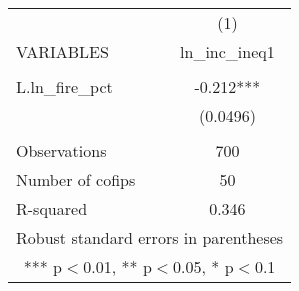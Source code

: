 \begin{tabular}{lc} \hline
 & (1) \\
VARIABLES & ln\_inc\_ineq1 \\ \hline
 &  \\
L.ln\_fire\_pct & -0.212*** \\
 & (0.0496) \\
 &  \\
Observations & 700 \\
Number of cofips & 50 \\
 R-squared & 0.346 \\ \hline
\multicolumn{2}{c}{ Robust standard errors in parentheses} \\
\multicolumn{2}{c}{ *** p$<$0.01, ** p$<$0.05, * p$<$0.1} \\
\end{tabular}
